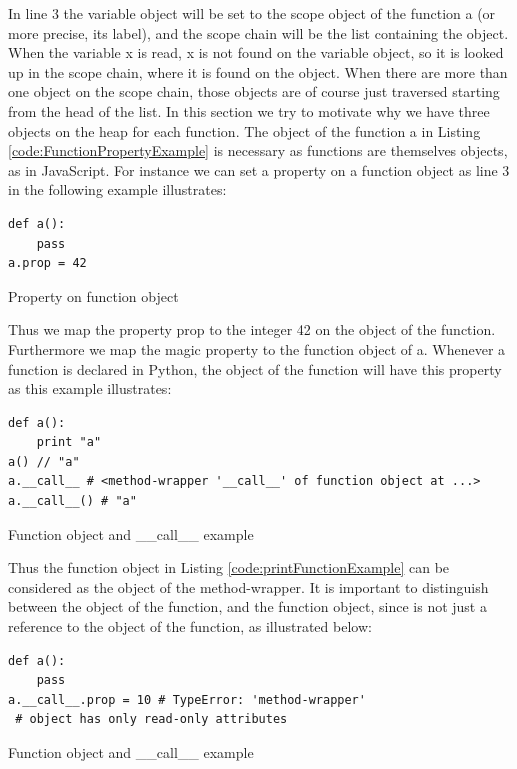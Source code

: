 In line 3 the variable object will be set to the scope object of the function a (or more precise, its label), and the scope chain will be the list containing the  object. When the variable x is read, x is not found on the variable object, so it is looked up in the scope chain, where it is found on the  object. When there are more than one object on the scope chain, those objects are of course just traversed starting from the head of the list.
In this section we try to motivate why we have three objects on the heap for each function. The object of the function a in Listing \ref{code:FunctionPropertyExample} is necessary as functions are themselves objects, as in JavaScript. For instance we can set a property on a function object as line 3 in the following example illustrates:
\begin{listing}[H]
	\begin{verbatim}
def a():
	pass
a.prop = 42
	\end{verbatim}
\caption{Property on function object}\label{code:FunctionPropertyExample}
\end{listing}
Thus we map the property prop to the integer 42 on the object of the function. Furthermore we map the magic property  to the function object of a. Whenever a function is declared in Python, the object of the function will have this property as this example illustrates:
\begin{listing}[H]
	\begin{verbatim}
def a():
	print "a"
a() // "a"
a.__call__ # <method-wrapper '__call__' of function object at ...> 
a.__call__() # "a"
	\end{verbatim}
\caption{Function object and \_\_call\_\_ example}\label{code:printFunctionExample}
\end{listing}
Thus the function object in Listing \ref{code:printFunctionExample} can be considered as the object of the method-wrapper. It is important to distinguish between the object of the function, and the function object, since  is not just a reference to the object of the function, as illustrated below:
\begin{listing}[H]
	\begin{verbatim}
def a(): 
	pass
a.__call__.prop = 10 # TypeError: 'method-wrapper' 
 # object has only read-only attributes
	\end{verbatim}
\caption{Function object and \_\_call\_\_ example}\label{code:callPropertyExample}
\end{listing}
